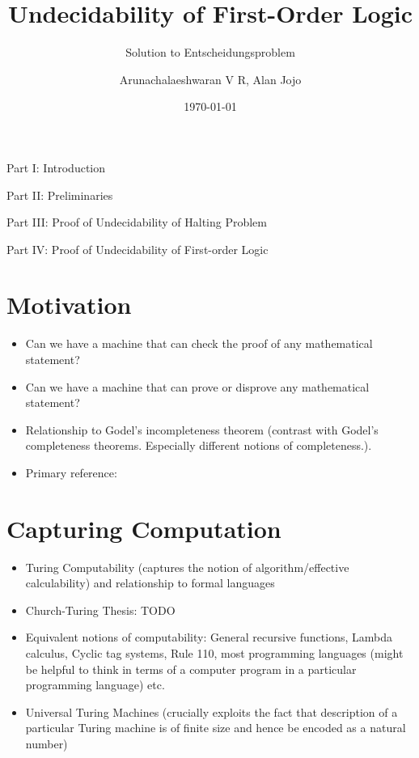 \documentclass[
11pt,notheorems,hyperref={pdfauthor=whatever}
]{beamer}
\title[
]{Undecidability of First-Order Logic}
\subtitle{Solution to Entscheidungsproblem}
\author[
]{
    Arunachalaeshwaran V R,
    Alan Jojo
}
\institute{
    Indian Institute of Science}
\date{\today}
\begin{document}
{
\begin{frame}
  \titlepage
\end{frame}
}
\addtocounter{framenumber}{-1}

\begin{frame}{Part I: Introduction}
    \tableofcontents[part=1]
\end{frame}
\begin{frame}{Part II: Preliminaries}
    \tableofcontents[part=2]
\end{frame}
\begin{frame}{Part III: Proof of Undecidability of Halting Problem}
    \tableofcontents[part=3]
\end{frame}
\begin{frame}{Part IV: Proof of Undecidability of First-order Logic}
    \tableofcontents[part=4]
\end{frame}


\section{Motivation}
\begin{frame}
\begin{itemize}
    \item Can we have a machine that can check the proof of any mathematical statement?
    \item Can we have a machine that can prove or disprove any mathematical statement?
    \item Relationship to Godel's incompleteness theorem (contrast with Godel's completeness theorems. Especially different notions of completeness.).
    \item Primary reference: \cite{boolos2002computability}
\end{itemize}     
\end{frame}

\section{Capturing Computation}
\begin{frame}
\begin{itemize}
    \item Turing Computability (captures the notion of algorithm/effective calculability) and relationship to formal languages
    \item Church-Turing Thesis: TODO
    \item Equivalent notions of computability: General recursive functions, Lambda calculus, Cyclic tag systems, Rule 110, most programming languages (might be helpful to think in terms of a computer program in a particular programming language) etc.
    \item Universal Turing Machines (crucially exploits the fact that description of a particular Turing machine is of finite size and hence be encoded as a natural number)
\end{itemize}     
\end{frame}
\end{document}
